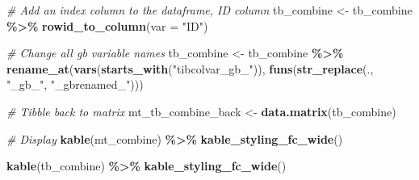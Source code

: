 \documentclass[
]{book}
\newenvironment{Shaded}{\begin{snugshade}}{\end{snugshade}}
\newcommand{\CommentTok}[1]{\textcolor[rgb]{0.56,0.35,0.01}{\textit{#1}}}
\newcommand{\DataTypeTok}[1]{\textcolor[rgb]{0.13,0.29,0.53}{#1}}
\newcommand{\KeywordTok}[1]{\textcolor[rgb]{0.13,0.29,0.53}{\textbf{#1}}}
\newcommand{\NormalTok}[1]{#1}
\newcommand{\OperatorTok}[1]{\textcolor[rgb]{0.81,0.36,0.00}{\textbf{#1}}}
\newcommand{\StringTok}[1]{\textcolor[rgb]{0.31,0.60,0.02}{#1}}
\begin{document}
\begin{Shaded}
\begin{Highlighting}[]
\CommentTok{\# Add an index column to the dataframe, ID column}
\NormalTok{tb\_combine \textless{}{-}}\StringTok{ }\NormalTok{tb\_combine }\OperatorTok{\%\textgreater{}\%}\StringTok{ }\KeywordTok{rowid\_to\_column}\NormalTok{(}\DataTypeTok{var =} \StringTok{"ID"}\NormalTok{)}

\CommentTok{\# Change all gb variable names}
\NormalTok{tb\_combine \textless{}{-}}\StringTok{ }\NormalTok{tb\_combine }\OperatorTok{\%\textgreater{}\%}
\StringTok{                  }\KeywordTok{rename\_at}\NormalTok{(}\KeywordTok{vars}\NormalTok{(}\KeywordTok{starts\_with}\NormalTok{(}\StringTok{"tibcolvar\_gb\_"}\NormalTok{)),}
                            \KeywordTok{funs}\NormalTok{(}\KeywordTok{str\_replace}\NormalTok{(., }\StringTok{"\_gb\_"}\NormalTok{, }\StringTok{"\_gbrenamed\_"}\NormalTok{)))}

\CommentTok{\# Tibble back to matrix}
\NormalTok{mt\_tb\_combine\_back \textless{}{-}}\StringTok{ }\KeywordTok{data.matrix}\NormalTok{(tb\_combine)}

\CommentTok{\# Display}
\KeywordTok{kable}\NormalTok{(mt\_combine) }\OperatorTok{\%\textgreater{}\%}\StringTok{ }\KeywordTok{kable\_styling\_fc\_wide}\NormalTok{()}
\end{Highlighting}
\end{Shaded}

\begin{table}[!h]
\centering
{}
\end{table}

\begin{Shaded}
\begin{Highlighting}[]
\KeywordTok{kable}\NormalTok{(tb\_combine) }\OperatorTok{\%\textgreater{}\%}\StringTok{ }\KeywordTok{kable\_styling\_fc\_wide}\NormalTok{()}
\end{Highlighting}
\end{Shaded}
\end{document}
